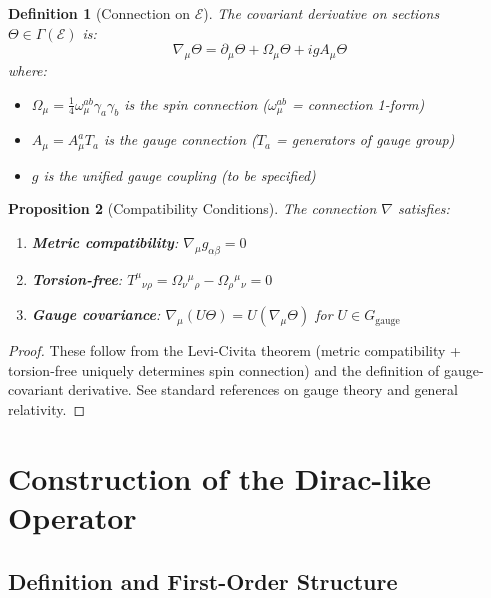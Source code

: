 \documentclass[12pt]{article}
\newtheorem{definition}{Definition}[section]
\newtheorem{proposition}[definition]{Proposition}
\begin{document}
\begin{definition}[Connection on $\mathcal{E}$]
The covariant derivative on sections $\Theta \in \Gamma(\mathcal{E})$ is:
\begin{equation}
\nabla_\mu \Theta = \partial_\mu \Theta + \Omega_\mu \Theta + i g A_\mu \Theta
\label{eq:covariant_derivative}
\end{equation}
where:
\begin{itemize}
    \item $\Omega_\mu = \frac{1}{4}\omega_\mu^{ab} \gamma_a \gamma_b$ is the spin connection ($\omega_\mu^{ab}$ = connection 1-form)
    \item $A_\mu = A_\mu^a T_a$ is the gauge connection ($T_a$ = generators of gauge group)
    \item $g$ is the unified gauge coupling (to be specified)
\end{itemize}
\end{definition}

\begin{proposition}[Compatibility Conditions]
The connection $\nabla$ satisfies:
\begin{enumerate}
    \item \textbf{Metric compatibility}: $\nabla_\mu g_{\alpha\beta} = 0$
    \item \textbf{Torsion-free}: $T^\mu{}_{\nu\rho} = \Omega_\nu{}^\mu{}_\rho - \Omega_\rho{}^\mu{}_\nu = 0$
    \item \textbf{Gauge covariance}: $\nabla_\mu (U \Theta) = U (\nabla_\mu \Theta)$ for $U \in G_{\text{gauge}}$
\end{enumerate}
\end{proposition}

\begin{proof}
These follow from the Levi-Civita theorem (metric compatibility + torsion-free uniquely determines spin connection) and the definition of gauge-covariant derivative. See standard references on gauge theory and general relativity.
\end{proof}

\section{Construction of the Dirac-like Operator}

\subsection{Definition and First-Order Structure}
\end{document}
